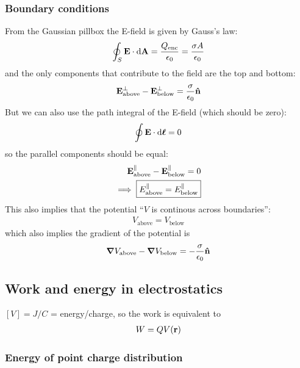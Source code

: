 \documentclass[../main.tex]{subfiles}
\begin{document}
\subsubsection{Boundary conditions}

From the Gaussian pillbox the E-field is given by Gauss's law:
\[\oint_S \vb E \cdot \dd \vb A = \frac{Q_{\textrm{enc}}}{\epsilon_0} = \frac{\sigma A}{\epsilon_0}\] 
and the only components that contribute to the field are the top and bottom:
\begin{align*}
    \vb E_{\textrm{above}}^{\perp} - \vb E_{\textrm{below}}^\perp = \frac{\sigma}{\epsilon_0} \vu n
\end{align*}
But we can also use the path integral of the E-field (which should be zero):
\begin{align*}
    \oint \vb E \cdot \dd \vb*\ell = 0
\end{align*}
so the parallel components should be equal:
\begin{align*}
    \vb E_{\textrm{above}}^{\parallel} - \vb E_{\textrm{below}}^\parallel = 0 \\
    \implies \boxed{E_{\textrm{above}}^{\parallel} = E_{\textrm{below}}^\parallel}
\end{align*}
This also implies that the potential ``$V$ is continous across boundaries'':
\begin{align*}
    V_{\textrm{above}} = V_{\textrm{below}}
\end{align*}
which also implies the gradient of the potential is
\begin{align*}
    \grad V_{\textrm{above}} - \grad V_{\textrm{below}} = -\frac{\sigma}{\epsilon_0} \vu n
\end{align*}

\subsection{Work and energy in electrostatics}

$[V] = \si{J/C}$ = energy/charge, so the work is equivalent to
\begin{align*}
    W = Q V(\vb r)
\end{align*}

\subsubsection{Energy of point charge distribution}
\end{document}
